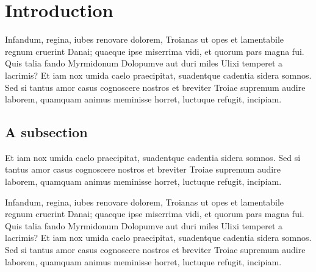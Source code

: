 \documentclass{xfm-plain}
\newcommand\sample{%
 Infandum, regina, iubes renovare dolorem, Troianas ut opes et
 lamen\-ta\-bile regnum cruerint Danai; quaeque ipse miserrima vidi, et
 quorum pars magna fui. Quis talia fando Myrmidonum Dolopumve aut duri
 miles Ulixi temperet a lacrimis? \smallsample
}
\newcommand\smallsample{%
 Et iam nox umida caelo praecipitat,
 suadentque cadentia sidera somnos.
 Sed si tantus amor casus cognoscere
 nostros et breviter Troiae supremum audire laborem, quamquam animus
 meminisse horret, luctuque refugit, incipiam.
}
\begin{document}
\maketitle

\section{Introduction}

\sample

\subsection{A subsection}

\smallsample

\sample
\end{document}
